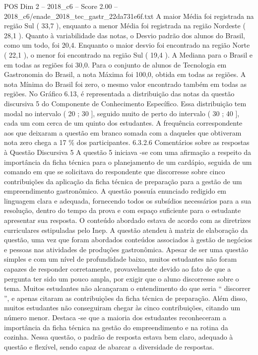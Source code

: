\begin{textsample}{POS Dim 2 – 2018\_c6 – Score 2.00 – 2018\_c6/enade\_2018\_tec\_gastr\_22da731e6f.txt}
A maior Média foi registrada na região Sul ( 33,7 ), enquanto a menor Média foi registrada na região Nordeste ( 28,1 ).
Quanto à variabilidade das notas, o Desvio padrão dos alunos do Brasil, como um todo, foi 20,4.
Enquanto o maior desvio foi encontrado na região Norte ( 22,1 ), o menor foi encontrado na região Sul ( 19,4 ).
A Mediana para o Brasil e em todas as regiões foi 30,0.
Para o conjunto de alunos de Tecnologia em Gastronomia do Brasil, a nota Máxima foi 100,0, obtida em todas as regiões.
A nota Mínima do Brasil foi zero, o mesmo valor encontrado também em todas as regiões.
No Gráfico 6.13, é representada a distribuição das notas da questão discursiva 5 do Componente de Conhecimento Específico.
Essa distribuição tem modal no intervalo ( 20 ; 30 ], seguido muito de perto do intervalo ( 30 ; 40 ], cada um com cerca de um quinto dos estudantes.
A frequência correspondente aos que deixaram a questão em branco somada com a daqueles que obtiveram nota zero chega a 17 \% dos participantes. 6.3.2.6 Comentários sobre as respostas à Questão Discursiva 5 A questão 5 iniciava -se com uma afirmação a respeito da importância da ficha técnica para o planejamento de um cardápio, seguida de um comando em que se solicitava do respondente que discorresse sobre cinco contribuições da aplicação da ficha técnica de preparação para a gestão de um empreendimento gastronômico.
A questão possuía enunciado redigido em linguagem clara e adequada, fornecendo todos os subsídios necessários para a sua resolução, dentro do tempo da prova e com espaço suficiente para o estudante apresentar sua resposta.
O conteúdo abordado estava de acordo com as diretrizes curriculares estipuladas pelo Inep.
A questão atendeu à matriz de elaboração da questão, uma vez que foram abordados conteúdos associados à gestão de negócios e pessoas nas atividades de produções gastronômica.
Apesar de ser uma questão simples e com um nível de profundidade baixo, muitos estudantes não foram capazes de responder corretamente, provavelmente devido ao fato de que a pergunta ter sido um pouco ampla, por exigir que o aluno discorresse sobre o tema.
Muitos estudantes não alcançaram o entendimento do que seria “ discorrer ”, e apenas citaram as contribuições da ficha técnica de preparação.
Além disso, muitos estudantes não conseguiram chegar às cinco contribuições, citando um número menor.
Destaca -se que a maioria dos estudantes reconheceram a importância da ficha técnica na gestão do empreendimento e na rotina da cozinha.
Nessa questão, o padrão de resposta estava bem claro, adequado à questão e flexível, sendo capaz de abarcar a diversidade de respostas.

\end{textsample}
